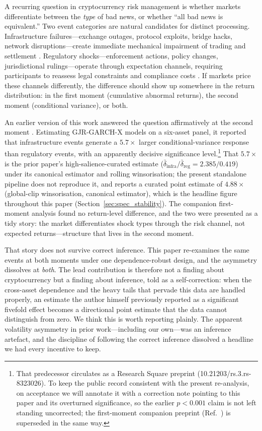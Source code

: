\documentclass[pdflatex,sn-mathphys-num]{sn-jnl}
\theoremstyle{thmstyleone}
\theoremstyle{thmstyletwo}
\theoremstyle{thmstylethree}
\begin{document}
A recurring question in cryptocurrency risk management is whether markets differentiate between the \emph{type} of bad news, or whether ``all bad news is equivalent.'' Two event categories are natural candidates for distinct processing. Infrastructure failures---exchange outages, protocol exploits, bridge hacks, network disruptions---create immediate mechanical impairment of trading and settlement \citep{ChenEtAl2023, Grobys2021}. Regulatory shocks---enforcement actions, policy changes, jurisdictional rulings---operate through expectation channels, requiring participants to reassess legal constraints and compliance costs \citep{AuerClaessens2018, FeinsteinWerbach2021}. If markets price these channels differently, the difference should show up somewhere in the return distribution: in the first moment (cumulative abnormal returns), the second moment (conditional variance), or both.

An earlier version of this work answered the question affirmatively at the second moment \citep{Farzulla2025Infra}. Estimating GJR-GARCH-X models on a six-asset panel, it reported that infrastructure events generate a $5.7\times$ larger conditional-variance response than regulatory events, with an apparently decisive significance level.\footnote{That predecessor circulates as a Research Square preprint (10.21203/rs.3.rs-8323026). To keep the public record consistent with the present re-analysis, on acceptance we will annotate it with a correction note pointing to this paper and its overturned significance, so the earlier $p<0.001$ claim is not left standing uncorrected; the first-moment companion preprint (Ref.~\citealp{Farzulla2025SameReturns}) is superseded in the same way.} That $5.7\times$ is the prior paper's high-salience-curated estimate ($\bar\delta_{\text{infra}}/\bar\delta_{\text{reg}}=2.385/0.419$) under its canonical estimator and rolling winsorisation; the present standalone pipeline does not reproduce it, and reports a curated point estimate of $4.88\times$ (global-clip winsorisation, canonical estimator), which is the headline figure throughout this paper (Section~\ref{sec:spec_stability}). The companion first-moment analysis \citep{Farzulla2025SameReturns} found no return-level difference, and the two were presented as a tidy story: the market differentiates shock types through the risk channel, not expected returns---structure that lives in the second moment.

That story does not survive correct inference. This paper re-examines the same events at both moments under one dependence-robust design, and the asymmetry dissolves at \emph{both}. The lead contribution is therefore not a finding about cryptocurrency but a finding about inference, told as a self-correction: when the cross-asset dependence and the heavy tails that pervade this data are handled properly, an estimate the author himself previously reported as a significant fivefold effect becomes a directional point estimate that the data cannot distinguish from zero. We think this is worth reporting plainly. The apparent volatility asymmetry in prior work---including our own---was an inference artefact, and the discipline of following the correct inference dissolved a headline we had every incentive to keep.
\end{document}
